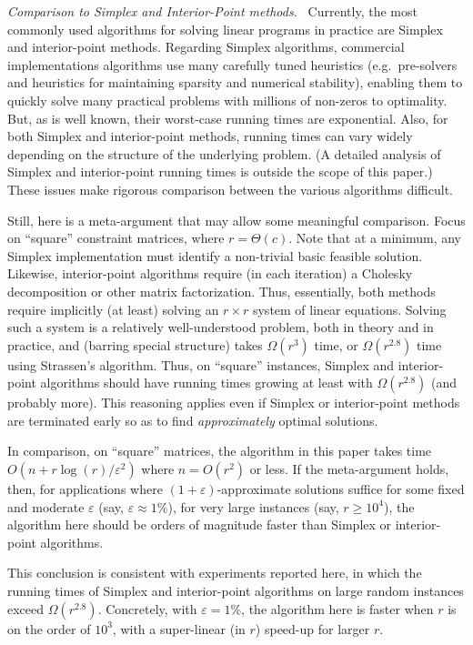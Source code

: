 \documentclass[11pt]{svjour3} \usepackage{fullpage}
\renewcommand{\paragraph}[1]{\smallskip\vspace{2pt}\par{\em #1}~}
\newcommand{\eps}{\varepsilon}
\begin{document}
\paragraph{Comparison to Simplex and Interior-Point methods.}
Currently, the most commonly used algorithms for solving linear programs in practice are Simplex and interior-point methods.  Regarding Simplex algorithms, commercial implementations algorithms use many carefully tuned heuristics (e.g.~pre-solvers and heuristics for maintaining sparsity and numerical stability), enabling them to quickly solve many practical problems with millions of non-zeros to optimality.  But, as is well known, 
their worst-case running times are exponential.
Also, for both Simplex and interior-point methods,
running times can vary widely depending on the structure of the underlying problem.
(A detailed analysis of Simplex and interior-point running times is outside the scope of this paper.)
These issues make rigorous comparison between the various algorithms difficult.

Still, here is a meta-argument that may allow some meaningful comparison. Focus on ``square'' constraint matrices, where $r=\Theta(c)$.   Note that at a minimum, any Simplex implementation must identify a non-trivial basic feasible solution.  Likewise, interior-point algorithms require (in each iteration) a Cholesky decomposition or other matrix factorization.  Thus, essentially, both methods require implicitly (at least) solving an $r\times r$ system of linear equations.  Solving such a system is a relatively well-understood problem, both in theory and in practice, and (barring special structure) takes $\Omega(r^3)$ time, or $\Omega(r^{2.8})$ time using Strassen's algorithm.  Thus, on ``square'' instances, Simplex and interior-point algorithms should have running times growing at least with $\Omega(r^{2.8})$ (and probably more).
This reasoning applies even if Simplex or interior-point methods are terminated early so as to find {\em approximately} optimal solutions.  

In comparison, on ``square'' matrices, the algorithm in this paper takes time $O(n + r\log(r)/\eps^2)$ where $n=O(r^2)$ or less.  
If the meta-argument holds, 
then, for applications where $(1+\eps)$-approximate solutions suffice
for some fixed and moderate $\eps$ (say, $\eps\approx 1\%$),
for very large instances (say, $r\ge 10^4$),
the algorithm here should be orders of magnitude faster than Simplex
or interior-point algorithms.

This conclusion is consistent with experiments reported here, in which the running times of Simplex and interior-point algorithms on large random instances exceed $\Omega(r^{2.8})$.  Concretely, with $\eps=1\%$, the algorithm here is faster when $r$ is on the order of $10^3$, with a super-linear (in $r$) speed-up for larger $r$.
\end{document}
